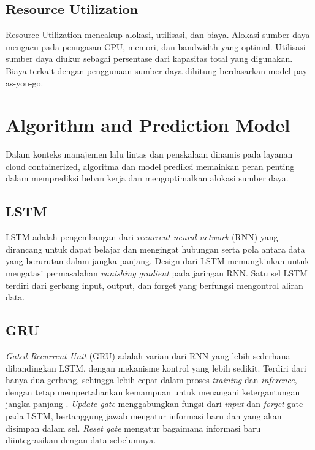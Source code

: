 \subsection{Resource Utilization}

Resource Utilization mencakup alokasi, utilisasi, dan biaya. Alokasi sumber daya mengacu pada penugasan CPU, memori, dan bandwidth yang optimal. Utilisasi sumber daya diukur sebagai persentase dari kapasitas total yang digunakan. Biaya terkait dengan penggunaan sumber daya dihitung berdasarkan model pay-as-you-go.

\section{Algorithm and Prediction Model}
\label{sec:algorithm-prediction}

Dalam konteks manajemen lalu lintas dan penskalaan dinamis pada layanan cloud containerized, algoritma dan model prediksi memainkan peran penting dalam memprediksi beban kerja dan mengoptimalkan alokasi sumber daya.

\subsection{LSTM}

LSTM adalah pengembangan dari \emph{recurrent neural network} (RNN) yang dirancang untuk dapat belajar dan mengingat hubungan serta pola antara data yang berurutan dalam jangka panjang. Design dari LSTM memungkinkan untuk mengatasi permasalahan \emph{vanishing gradient} pada jaringan RNN. Satu sel LSTM terdiri dari gerbang input, output, dan forget yang berfungsi mengontrol aliran data.

\subsection{GRU}

\emph{Gated Recurrent Unit} (GRU) adalah varian dari RNN yang lebih sederhana dibandingkan LSTM, dengan mekanisme kontrol yang lebih sedikit. Terdiri dari hanya dua gerbang, sehingga lebih cepat dalam proses \emph{training} dan \emph{inference}, dengan tetap mempertahankan kemampuan untuk menangani ketergantungan jangka panjang \citep{mondal2023toward}. \emph{Update gate} menggabungkan fungsi dari \emph{input} dan \emph{forget} gate pada LSTM, bertanggung jawab mengatur informasi baru dan yang akan disimpan dalam sel. \emph{Reset gate} mengatur bagaimana informasi baru diintegrasikan dengan data sebelumnya.

